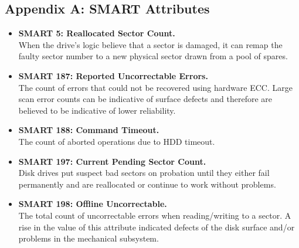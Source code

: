 \documentclass[12pt,a4paper,english]{amsart}
\begin{document}
\subsection*{Appendix A: SMART Attributes}

\begin{appendix}
	\begin{itemize}
		\item \textbf{SMART 5: Reallocated Sector Count.} \\
		When the drive’s logic believe that a sector is damaged, it can remap the faulty sector number to a new physical sector drawn from a pool of spares.
		\item \textbf{SMART 187: Reported Uncorrectable Errors.} \\
		The count of errors that could not be recovered using hardware ECC. Large scan error counts can be indicative of surface defects and therefore are believed to be indicative of lower reliability.
		\item \textbf{SMART 188: Command Timeout.} \\
		The count of aborted operations due to HDD timeout.
		\item \textbf{SMART 197: Current Pending Sector Count.} \\
		Disk drives put suspect bad sectors on probation until they either fail permanently and are reallocated or continue to work without problems.
		\item \textbf{SMART 198: Offline Uncorrectable.} \\
		The total count of uncorrectable errors when reading/writing to a sector. A rise in the value of this attribute indicated defects of the disk surface and/or problems in the mechanical subsystem.
	\end{itemize}
\end{appendix}
\end{document}
